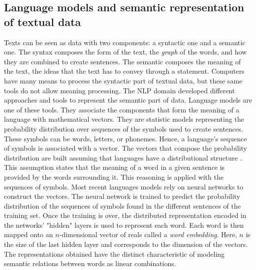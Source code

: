 \subsection{Language models and semantic representation of textual data}
Texts can be seen as data with two components: a syntactic one and a semantic one.
The syntax composes the form of the text, the \emph{graph} of the words, and how they are combined to create sentences.
The semantic composes the meaning of the text, the ideas that the text has to convey through a statement.
Computers have many means to process the syntactic part of textual data, but these same tools do not allow meaning processing.
The NLP domain developed different approaches and tools to represent the semantic part of data.
Language models are one of these tools.
They associate the components that form the meaning of a language with mathematical vectors.
They are statistic models representing the probability distribution over sequences of the symbols used to create sentences.
These symbols can be words, letters, or phonemes.
Hence, a language's sequence of symbols is associated with a vector.
The vectors that compose the probability distribution are built assuming that languages have a distributional structure \parencite{harrisDistributionalStructure1954}.
This assumption states that the meaning of a word in a given sentence is provided by the words surrounding it.
This reasoning is applied with the sequences of symbols.
Most recent languages models rely on neural networks to construct the vectors.
The neural network is trained to predict the probability distribution of the sequences of symbols found in the different sentences of the training set.
Once the training is over, the distributed representation encoded in the networks' "hidden" layers is used to represent each word.
Each word is then mapped onto an \(n\)-dimensional vector of reals called a \emph{word embedding}.
Here, \(n\) is the size of the last hidden layer and corresponds to the dimension of the vectors.
The representations obtained have the distinct characteristic of modeling semantic relations between words as linear combinations.

